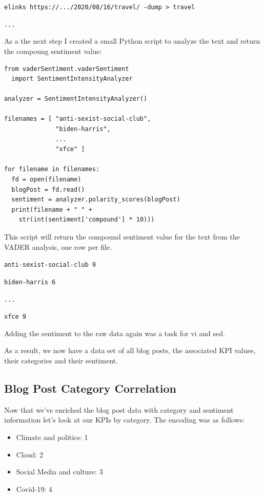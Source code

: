 \verb|elinks https://.../2020/08/16/travel/ -dump > travel|

\verb|...|

As a the next step I created a small Python script to analyze the text and return the compoung sentiment value:

\begin{lstlisting}[caption=Vader Sentiment Compound, frame=single, basicstyle=\ttfamily]
from vaderSentiment.vaderSentiment 
  import SentimentIntensityAnalyzer

analyzer = SentimentIntensityAnalyzer()

filenames = [ "anti-sexist-social-club",
              "biden-harris",
              ...
              "xfce" ]

for filename in filenames:
  fd = open(filename)
  blogPost = fd.read()
  sentiment = analyzer.polarity_scores(blogPost)
  print(filename + " " + 
    str(int(sentiment['compound'] * 10)))

\end{lstlisting}

This script will return the compound sentiment value for the text from the VADER analysis, one row per file.

\verb|anti-sexist-social-club 9|

\verb|biden-harris 6|

\verb|...|

\verb|xfce 9|

Adding the sentiment to the raw data again was a task for vi and sed.

As a result, we now have a data set of all blog posts, the associated KPI values, their categories and their sentiment.

\subsection{Blog Post Category Correlation}

Now that we've enriched the blog post data with category and sentiment information let's look at our KPIs by category. The encoding was as follows:

\begin{itemize}
\item Climate and politics: 1
\item Cloud: 2
\item Social Media and culture: 3
\item Covid-19: 4
\end{itemize}

